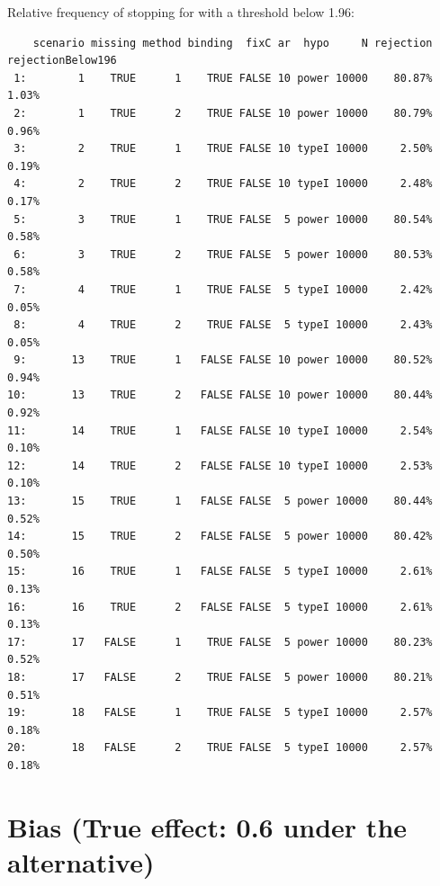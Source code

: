 \documentclass[12pt]{article}
\begin{document}
Relative frequency of stopping for with a threshold below 1.96:
\begin{verbatim}
    scenario missing method binding  fixC ar  hypo     N rejection rejectionBelow196
 1:        1    TRUE      1    TRUE FALSE 10 power 10000    80.87%             1.03%
 2:        1    TRUE      2    TRUE FALSE 10 power 10000    80.79%             0.96%
 3:        2    TRUE      1    TRUE FALSE 10 typeI 10000     2.50%             0.19%
 4:        2    TRUE      2    TRUE FALSE 10 typeI 10000     2.48%             0.17%
 5:        3    TRUE      1    TRUE FALSE  5 power 10000    80.54%             0.58%
 6:        3    TRUE      2    TRUE FALSE  5 power 10000    80.53%             0.58%
 7:        4    TRUE      1    TRUE FALSE  5 typeI 10000     2.42%             0.05%
 8:        4    TRUE      2    TRUE FALSE  5 typeI 10000     2.43%             0.05%
 9:       13    TRUE      1   FALSE FALSE 10 power 10000    80.52%             0.94%
10:       13    TRUE      2   FALSE FALSE 10 power 10000    80.44%             0.92%
11:       14    TRUE      1   FALSE FALSE 10 typeI 10000     2.54%             0.10%
12:       14    TRUE      2   FALSE FALSE 10 typeI 10000     2.53%             0.10%
13:       15    TRUE      1   FALSE FALSE  5 power 10000    80.44%             0.52%
14:       15    TRUE      2   FALSE FALSE  5 power 10000    80.42%             0.50%
15:       16    TRUE      1   FALSE FALSE  5 typeI 10000     2.61%             0.13%
16:       16    TRUE      2   FALSE FALSE  5 typeI 10000     2.61%             0.13%
17:       17   FALSE      1    TRUE FALSE  5 power 10000    80.23%             0.52%
18:       17   FALSE      2    TRUE FALSE  5 power 10000    80.21%             0.51%
19:       18   FALSE      1    TRUE FALSE  5 typeI 10000     2.57%             0.18%
20:       18   FALSE      2    TRUE FALSE  5 typeI 10000     2.57%             0.18%
\end{verbatim}


\clearpage

\section{Bias (True effect: 0.6 under the alternative)}
\label{sec:org89f3c0f}
\end{document}
